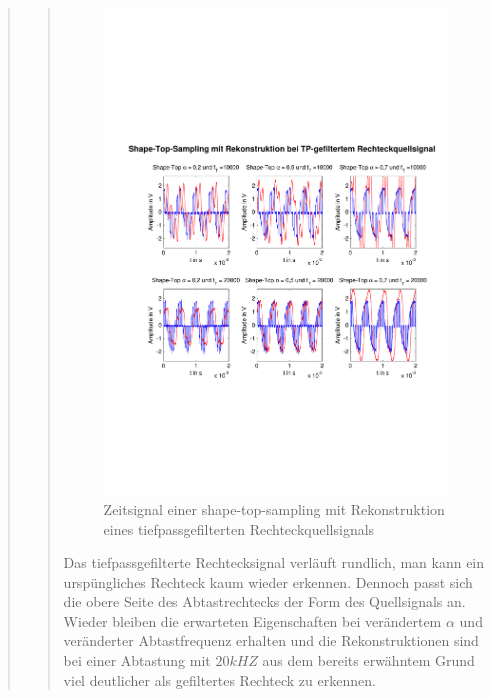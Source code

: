 \begin{quote}
\begin{quote}
        	\begin{figure}[H]
            \centering
            \includegraphics[scale=0.6, trim = 1.5cm 6cm 1cm 8cm,
            clip]{./Bilder/shape-top-tp-recht}
                \caption{Zeitsignal einer shape-top-sampling mit Rekonstruktion
                eines tiefpassgefilterten Rechteckquellsignals}
      	    \end{figure}
        	 
        	Das tiefpassgefilterte Rechtecksignal verläuft rundlich, man kann ein
        	urspüngliches Rechteck kaum wieder erkennen. Dennoch passt sich die obere Seite des
        	Abtastrechtecks der Form des Quellsignals an. Wieder bleiben die erwarteten
        	Eigenschaften bei verändertem $\alpha$ und veränderter Abtastfrequenz
        	erhalten und die Rekonstruktionen sind bei einer Abtastung mit $20 kHZ$ aus
        	dem bereits erwähntem Grund viel deutlicher als gefiltertes Rechteck zu
        	erkennen.\\ 
        	

\end{quote}
\end{quote}
